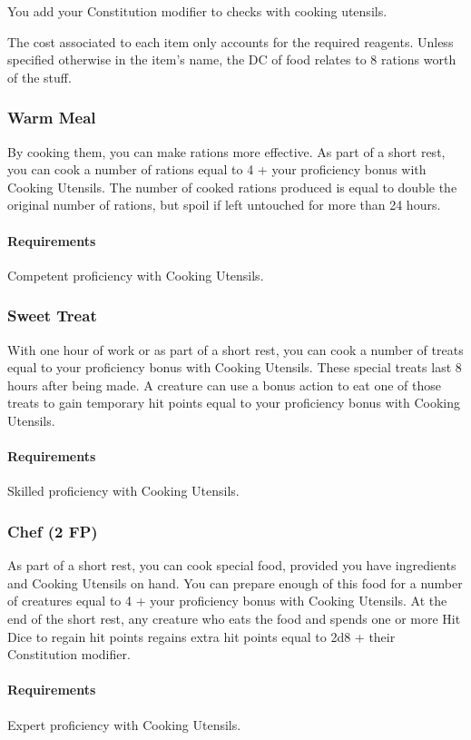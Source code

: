     You add your Constitution modifier to checks with cooking utensils.

    The cost associated to each item only accounts for the required reagents.
    Unless specified otherwise in the item's name, the DC of food relates to 8 rations worth of the stuff.
\subsubsection{Warm Meal} \label{feat::warmmeal}
    By cooking them, you can make rations more effective.
    As part of a short rest, you can cook a number of rations equal to 4 + your proficiency bonus with Cooking Utensils.
    The number of cooked rations produced is equal to double the original number of rations, but spoil if left untouched for more than 24 hours.
    \paragraph{Requirements} Competent proficiency with Cooking Utensils.
\subsubsection{Sweet Treat} \label{feat::sweettreat}
    With one hour of work or as part of a short rest, you can cook a number of treats equal to your proficiency bonus with Cooking Utensils.
    These special treats last 8 hours after being made.
    A creature can use a bonus action to eat one of those treats to gain temporary hit points equal to your proficiency bonus with Cooking Utensils.
    \paragraph{Requirements} Skilled proficiency with Cooking Utensils.
\subsubsection{Chef (2 FP)} \label{feat::chef}
    As part of a short rest, you can cook special food, provided you have ingredients and Cooking Utensils on hand.
    You can prepare enough of this food for a number of creatures equal to 4 + your proficiency bonus with Cooking Utensils.
    At the end of the short rest, any creature who eats the food and spends one or more Hit Dice to regain hit points regains extra hit points equal to 2d8 + their Constitution modifier.
    \paragraph{Requirements} Expert proficiency with Cooking Utensils.


